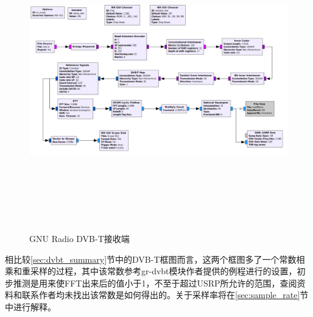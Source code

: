 		\begin{figure}[htbp]
			\centering
			\includegraphics[height=13cm,angle=-90]{figures/gnuradio_dvbt_tx.png}
			\caption{GNU Radio DVB-T接收端}
			\label{fig:gnuradio_dvbt_rx}
		\end{figure}
		\par 相比较\ref{sec:dvbt_summary}节中的DVB-T框图而言，这两个框图多了一个常数相乘和重采样的过程，其中该常数参考gr-dvbt模块作者提供的例程进行的设置，初步推测是用来使FFT出来后的值小于1，不至于超过USRP所允许的范围，查阅资料和联系作者均未找出该常数是如何得出的。关于采样率将在\ref{sec:sample_rate}节中进行解释。
